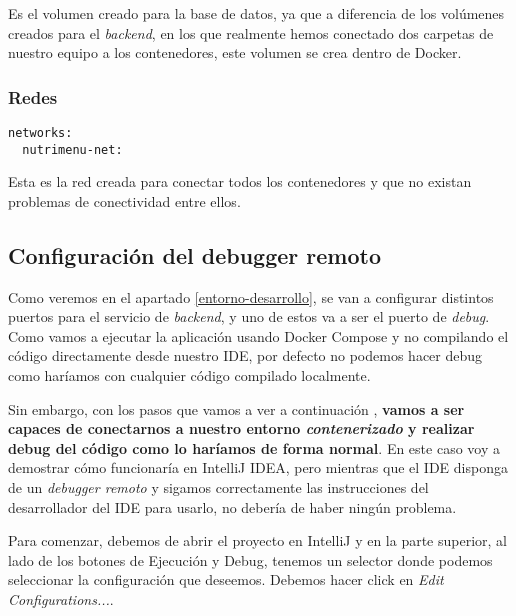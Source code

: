 Es el volumen creado para la base de datos, ya que a diferencia de los volúmenes creados para el \textit{backend}, en los que realmente hemos conectado dos carpetas de nuestro equipo a los contenedores, este volumen se crea dentro de Docker.

\subsubsection{Redes}

\begin{lstlisting}
networks:
  nutrimenu-net:
\end{lstlisting}

Esta es la red creada para conectar todos los contenedores y que no existan problemas de conectividad entre ellos.

\subsection{Configuración del debugger remoto}

Como veremos en el apartado \ref{entorno-desarrollo}, se van a configurar distintos puertos para el servicio de \textit{backend}, y uno de estos va a ser el puerto de \textit{debug}. Como vamos a ejecutar la aplicación usando Docker Compose y no compilando el código directamente desde nuestro IDE, por defecto no podemos hacer debug como haríamos con cualquier código compilado localmente. 

Sin embargo, con los pasos que vamos a ver a continuación \cite{medium:spring-boot-in-docker}, \textbf{vamos a ser capaces de conectarnos a nuestro entorno \textit{contenerizado} y realizar debug del código como lo haríamos de forma normal}. En este caso voy a demostrar cómo funcionaría en IntelliJ IDEA, pero mientras que el IDE disponga de un \textit{debugger remoto} y sigamos correctamente las instrucciones del desarrollador del IDE para usarlo, no debería de haber ningún problema.


Para comenzar, debemos de abrir  el proyecto en IntelliJ y en la parte superior, al lado de los botones de Ejecución y Debug, tenemos un selector donde podemos seleccionar la configuración que deseemos. Debemos hacer click en \textit{Edit Configurations...}.


